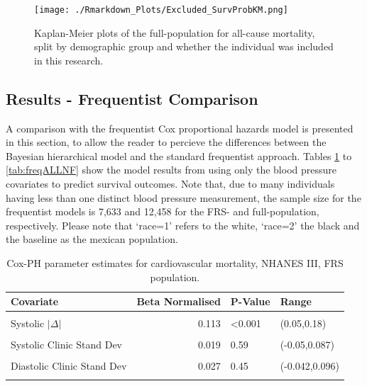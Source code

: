 \documentclass[
]{article}
\begin{document}
\begin{figure}
\hypertarget{fig:excpop}{%
\centering
\texttt{[image: ./Rmarkdown\_Plots/Excluded\_SurvProbKM.png]}
\caption{Kaplan-Meier plots of the full-population for all-cause mortality, split by demographic group and whether the individual was included in this research.}\label{fig:excpop}
}
\end{figure}

\hypertarget{results---frequentist-comparison}{%
\subsection{Results - Frequentist Comparison}\label{results---frequentist-comparison}}

A comparison with the frequentist Cox proportional hazards model is presented in this section, to allow the reader to percieve the differences between the Bayesian hierarchical model and the standard frequentist approach. Tables \ref{tab:freqCVDF} to \ref{tab:freqALLNF} show the model results from using only the blood pressure covariates to predict survival outcomes. Note that, due to many individuals having less than one distinct blood pressure measurement, the sample size for the frequentist models is 7,633 and 12,458 for the FRS- and full-population, respectively. Please note that `race=1' refers to the white, `race=2' the black and the baseline as the mexican population.

\begin{table}[!h]

\caption{\label{tab:freqCVDF}Cox-PH parameter estimates for cardiovascular mortality, NHANES III, FRS population.}
\centering
\begin{tabular}[t]{lrll}
\toprule
Covariate & Beta Normalised & P-Value & Range\\
\midrule
\cellcolor{gray!6}{FRS (1998)} & \cellcolor{gray!6}{0.519} & \cellcolor{gray!6}{<0.001} & \cellcolor{gray!6}{(0.36,0.67)}\\
Systolic $|\Delta|$ & 0.113 & <0.001 & (0.05,0.18)\\
\cellcolor{gray!6}{Diastolic $|\Delta|$} & \cellcolor{gray!6}{0.108} & \cellcolor{gray!6}{0.0033} & \cellcolor{gray!6}{(0.035,0.18)}\\
Systolic Clinic Stand Dev & 0.019 & 0.59 & (-0.05,0.087)\\
\cellcolor{gray!6}{Systolic Home Stand Dev} & \cellcolor{gray!6}{0.054} & \cellcolor{gray!6}{0.13} & \cellcolor{gray!6}{(-0.015,0.12)}\\
Diastolic Clinic Stand Dev & 0.027 & 0.45 & (-0.042,0.096)\\
\cellcolor{gray!6}{Diastolic Home Stand Dev} & \cellcolor{gray!6}{0.030} & \cellcolor{gray!6}{0.41} & \cellcolor{gray!6}{(-0.043,0.1)}\\
\bottomrule
\end{tabular}
\end{table}
\end{document}
